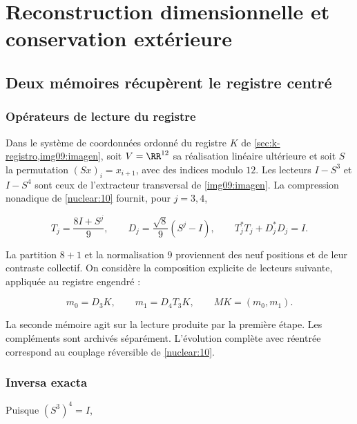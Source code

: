 \section{Reconstruction dimensionnelle et conservation extérieure
}
\label{nuclear:11}
\subsection{Deux mémoires récupèrent le registre centré
}

\subsubsection{Opérateurs de lecture du registre
}

Dans le système de coordonnées ordonné du registre \(K\) de
\cref{sec:k-registro,img09:imagen}, soit \(V=\RR^{12}\) sa
réalisation linéaire ultérieure et soit \(S\) la permutation
\((Sx)_i=x_{i+1}\), avec des indices modulo \(12\).
Les lecteurs \(I-S^3\) et \(I-S^4\) sont ceux de l’extracteur transversal
de \cref{img09:imagen}.
La compression nonadique de \cref{nuclear:10} fournit,
pour \(j=3,4\),



\begin{equation}
T_j=\frac{8I+S^j}{9},\qquad D_j=\frac{\sqrt8}{9}(S^j-I),
\qquad T_j^*T_j+D_j^*D_j=I.
\label{nuc11:eq:1}
\end{equation}



La partition \(8+1\) et la normalisation \(9\) proviennent des neuf
positions et de leur contraste collectif.
On considère la composition explicite de lecteurs suivante,
appliquée au registre engendré :



\begin{equation}
m_0=D_3K,\qquad m_1=D_4T_3K,
\qquad M K=(m_0,m_1).
\label{nuc11:eq:2}
\end{equation}



La seconde mémoire agit sur la lecture produite par la première
étape. Les compléments sont archivés séparément.
L’évolution complète avec réentrée correspond au couplage
réversible de \cref{nuclear:10}.

\subsubsection{Inversa exacta}

Puisque \((S^3)^4=I\),



